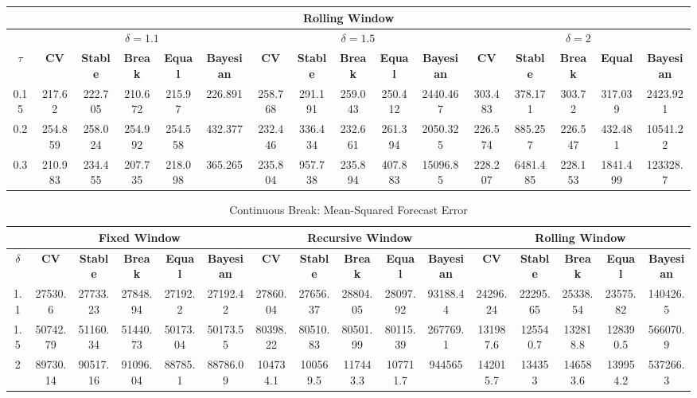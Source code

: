 \begin{sidewaystable}
\begin{adjustbox}{width=\textwidth,totalheight=\textheight,keepaspectratio}
\begin{tabular}{cccccccccccccccc}
\multicolumn{16}{c}{\textbf{Rolling Window}}\\ \hline
 & \multicolumn{5}{c}{$\delta=1.1$} & \multicolumn{5}{c}{$\delta=1.5$} & \multicolumn{5}{c}{$\delta=2$} \\ \hline
$\tau$ & \textbf{CV} & \textbf{Stable} & \textbf{Break} & \textbf{Equal} & \textbf{Bayesian} & \textbf{CV} & \textbf{Stable} & \textbf{Break} & \textbf{Equal} & \textbf{Bayesian} & \textbf{CV} & \textbf{Stable} & \textbf{Break} & \textbf{Equal} & \textbf{Bayesian}\\ \hline
0.15 & 217.62 & 222.705 & 210.672 & 215.97 & 226.891 & 258.768 & 291.191 & 259.043 & 250.412 & 2440.467 & 303.483 & 378.171 & 303.72 & 317.039 & 2423.921\\
0.2 & 254.859 & 258.024 & 254.992 & 254.558 & 432.377 & 232.446 & 336.434 & 232.661 & 261.394 & 2050.325 & 226.574 & 885.257 & 226.547 & 432.481 & 10541.22\\
0.3 & 210.983 & 234.455 & 207.735 & 218.098 & 365.265 & 235.804 & 957.738 & 235.894 & 407.883 & 15096.85 & 228.207 & 6481.485 & 228.153 & 1841.499 & 123328.7\\ \hline \hline
\end{tabular}
\end{adjustbox}
\end{sidewaystable}
\newpage
\begin{sidewaystable}
\centering
\caption{Continuous Break: Mean-Squared Forecast Error}
\begin{adjustbox}{width=\textwidth,totalheight=\textheight,keepaspectratio}
\begin{tabular}{cccccccccccccccc} \hline \hline
 & \multicolumn{5}{c}{\textbf{Fixed Window}} & \multicolumn{5}{c}{\textbf{Recursive Window}} & \multicolumn{5}{c}{\textbf{Rolling Window}} \\ \hline
$\delta$ & \textbf{CV} & \textbf{Stable} & \textbf{Break} & \textbf{Equal} & \textbf{Bayesian} & \textbf{CV} & \textbf{Stable} & \textbf{Break} & \textbf{Equal} & \textbf{Bayesian} & \textbf{CV} & \textbf{Stable} & \textbf{Break} & \textbf{Equal} & \textbf{Bayesian}\\ \hline
1.1 & 27530.6 & 27733.23 & 27848.94 & 27192.2 & 27192.42 & 27860.04 & 27656.37 & 28804.05 & 28097.92 & 93188.44 & 24296.24 & 22295.65 & 25338.54 & 23575.82 & 140426.5\\
1.5 & 50742.79 & 51160.34 & 51440.73 & 50173.04 & 50173.55 & 80398.22 & 80510.83 & 80501.99 & 80115.39 & 267769.1 & 131987.6 & 125540.7 & 132818.8 & 128390.5 & 566070.9\\
2 & 89730.14 & 90517.16 & 91096.04 & 88785.1 & 88786.09 & 104734.1 & 100569.5 & 117443.3 & 107711.7 & 944565 & 142015.7 & 134353 & 146583.6 & 139954.2 & 537266.3\\ \hline \hline
\end{tabular}
\end{adjustbox}
\end{sidewaystable}
